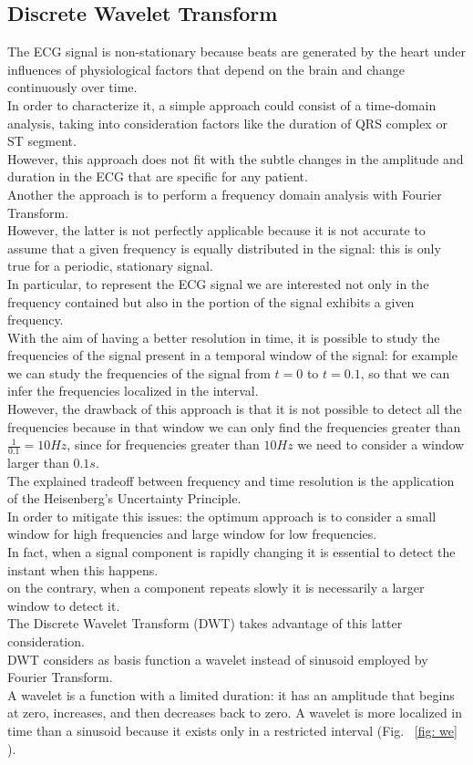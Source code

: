\documentclass[LaM,binding=0.6cm]{sapthesis}
\begin{document}
\subsection{Discrete Wavelet Transform}
The ECG signal is non-stationary because beats are generated by the heart under influences of physiological factors that depend on the brain and change continuously over time.\\In order to characterize it, a simple approach could consist of a time-domain analysis, taking into consideration factors like the duration of QRS complex or ST segment.\\However, this approach does not fit with the subtle changes in the amplitude and duration in the ECG that are specific for any patient.\\Another the approach is to perform a frequency domain analysis with Fourier Transform.\\However, the latter is not perfectly applicable because it is not accurate to assume that a given frequency is equally distributed in the signal: this is only true for a periodic, stationary signal.\\In particular, to represent the ECG signal we are interested not only in the frequency contained but also in the portion of the signal exhibits a given frequency.\\With the aim of having a better resolution in time, it is possible to study the frequencies of the signal present in a temporal window of the signal: for example we can study the frequencies of the signal from $t=0$ to $t=0.1$, so that we can infer the frequencies localized in the interval.\\However, the drawback of this approach is that it is not possible to detect all the frequencies because in that window we can only find the frequencies greater than $\frac{1}{0.1}=10 Hz$, since for frequencies greater than $10 Hz$ we need to consider a window larger than $0.1s$.\\The explained tradeoff between frequency and time resolution is the application of the Heisenberg's Uncertainty Principle.\\In order to mitigate this issues: the optimum approach is to consider a small window for high frequencies and large window for low frequencies.\\In fact, when a signal component is rapidly changing it is essential to detect the instant when this happens.\\on the contrary, when a component repeats slowly it is necessarily a larger window to detect it.\\The Discrete Wavelet Transform (DWT) takes advantage of this latter consideration.\\DWT considers as basis function a wavelet instead of sinusoid employed by Fourier Transform.\\A wavelet is a function with a limited duration: it has an amplitude that begins at zero, increases, and then decreases back to zero. A wavelet is more localized in time than a sinusoid because it exists only in a restricted interval (Fig. ~\ref{fig: we} ). 
\end{document}
